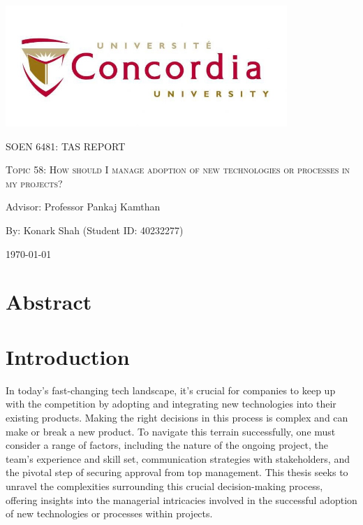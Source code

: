 \documentclass{article}
\begin{document}
\begin{titlepage}
    \centering
    \includegraphics[width=0.8\textwidth]{image.jpeg}\par %
     \vspace{2cm}
    {\scshape\Large SOEN 6481: TAS REPORT \par}
    \vspace{1.5cm}
    {\scshape\Huge Topic 58: How should I manage adoption of new technologies or processes in my projects?\par}
    \vspace{1.5cm}
    {\large Advisor: Professor Pankaj Kamthan\par}
    \vspace{1.5cm}
    {\large By: Konark Shah (Student ID: 40232277)\par}
    \vspace{1cm}
    {\large \today\par}
\end{titlepage}

\tableofcontents

\newpage

\section*{Abstract}
\lipsum[1]

\section{Introduction}
In today's fast-changing tech landscape, it's crucial for companies to keep up with the competition by adopting and integrating new technologies into their existing products. Making the right decisions in this process is complex and can make or break a new product. To navigate this terrain successfully, one must consider a range of factors, including the nature of the ongoing project, the team's experience and skill set, communication strategies with stakeholders, and the pivotal step of securing approval from top management. This thesis seeks to unravel the complexities surrounding this crucial decision-making process, offering insights into the managerial intricacies involved in the successful adoption of new technologies or processes within projects.
\end{document}
